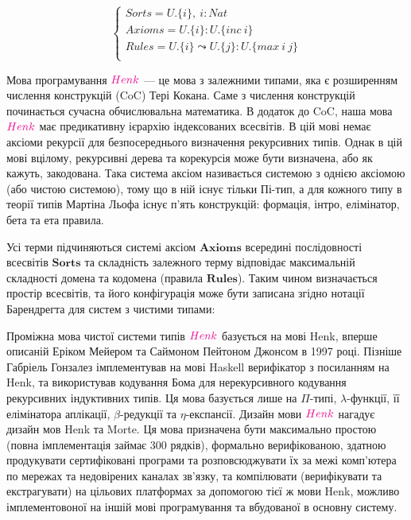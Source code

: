 \begin{equation}
\begin{cases}
Sorts = U.\{i\},\ i : Nat\\
Axioms = U.\{i\} : U.\{inc\ i\}\\
Rules = U.\{i\} \leadsto U.\{j\} : U.\{max\ i\ j\}\\
\end{cases}
\end{equation}

Мова програмування $\textcolor{magenta}{Henk}$ --- це мова з залежними типами, яка є розширенням
числення конструкцій (CoC) Тері Кокана. Саме з числення
конструкцій починається сучасна обчислювальна математика. В додаток до CoC,
наша мова $\textcolor{magenta}{Henk}$ має предикативну ієрархію індексованих всесвітів. В цій мові немає
аксіоми рекурсії для безпосереднього визначення рекурсивних типів. Однак в цій мові
вцілому, рекурсивні дерева та корекурсія може бути визначена, або як кажуть, закодована.
Така система аксіом називається системою з однією аксіомою (або чистою системою), тому що в ній
існує тільки Пі-тип, а для кожного типу в теорії типів Мартіна Льофа існує п'ять
конструкцій: формація, інтро, елімінатор, бета та ета правила.

Усі терми підчиняються системі аксіом $\textbf{Axioms}$ всередині
послідовності всесвітів $\textbf{Sorts}$ та складність залежного
терму відповідає максимальній складності домена та кодомена
(правила $\textbf{Rules}$). Таким чином визначається простір всесвітів,
та його конфігурація може бути записана згідно нотації
Барендрегта для систем з чистими типами:

Проміжна мова чистої системи типів $\textcolor{magenta}{Henk}$ базується на мові
Henk\cite{Erik97}, вперше описаній Еріком Мейером та Саймоном Пейтоном Джонсом в 1997 році.
Пізніше Габріель Гонзалез імплементував на мові Haskell
верифікатор з посиланням на Henk, та використував кодування Бома для нерекурсивного
кодування рекурсивних індуктивних типів. Ця мова базується лише на $\Pi$-типі,
$\lambda$-функції, її елімінатора аплікації, $\beta$-редукції та $\eta$-експансії.
Дизайн мови $\textcolor{magenta}{Henk}$ нагадує дизайн мов Henk та Morte.
Ця мова призначена бути максимально простою (повна імплементація займає 300 рядків),
формально верифікованою, здатною продукувати сертифіковані програми та
розповсюджувати їх за межі комп'ютера по мережах та недовірених каналах зв'язку,
та компілювати (верифікувати та екстрагувати) на цільових платформах за допомогою
тієї ж мови Henk, можливо імплементовоної на іншій мові програмування та вбудованої
в основну систему.

